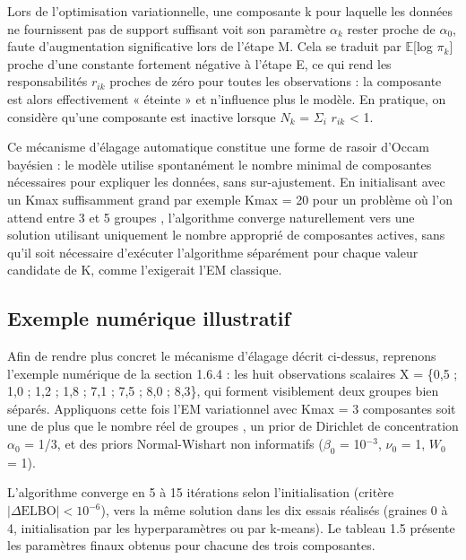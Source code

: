 Lors de l'optimisation variationnelle, une composante k pour laquelle les données ne fournissent pas de support suffisant voit son paramètre $\alpha _{k}$ rester proche de $\alpha _{0}$, faute d'augmentation significative lors de l'étape M. Cela se traduit par $\mathbb{E}$[log $\pi _{k}$] proche d'une constante fortement négative à l'étape E, ce qui rend les responsabilités $r_{ik}$ proches de zéro pour toutes les observations : la composante est alors effectivement « éteinte » et n'influence plus le modèle. En pratique, on considère qu'une composante est inactive lorsque $N_{k}$ = $\Sigma _{i}$ $r_{ik}$ < 1.

Ce mécanisme d'élagage automatique constitue une forme de rasoir d'Occam bayésien : le modèle utilise spontanément le nombre minimal de composantes nécessaires pour expliquer les données, sans sur-ajustement. En initialisant avec un Kmax suffisamment grand  par exemple Kmax = 20 pour un problème où l'on attend entre 3 et 5 groupes , l'algorithme converge naturellement vers une solution utilisant uniquement le nombre approprié de composantes actives, sans qu'il soit nécessaire d'exécuter l'algorithme séparément pour chaque valeur candidate de K, comme l'exigerait l'EM classique.

\subsection{Exemple numérique illustratif}
Afin de rendre plus concret le mécanisme d'élagage décrit ci-dessus, reprenons l'exemple numérique de la section 1.6.4 : les huit observations scalaires X = \{0,5 ; 1,0 ; 1,2 ; 1,8 ; 7,1 ; 7,5 ; 8,0 ; 8,3\}, qui forment visiblement deux groupes bien séparés. Appliquons cette fois l'EM variationnel avec Kmax = 3 composantes  soit une de plus que le nombre réel de groupes , un prior de Dirichlet de concentration $\alpha _{0}$ = 1/3, et des priors Normal-Wishart non informatifs ($\beta _{0}$ = 10$^{-3}$, $\nu _{0}$ = 1, $W_{0}$ = 1).

L'algorithme converge en 5 à 15 itérations selon l'initialisation (critère $|\Delta \mathrm{ELBO}| < 10^{-6}$), vers la même solution dans les dix essais réalisés (graines 0 à 4, initialisation par les hyperparamètres ou par k-means). Le tableau 1.5 présente les paramètres finaux obtenus pour chacune des trois composantes.

